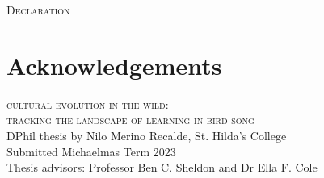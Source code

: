 \documentclass[9pt, twocolumn, twoside]{nilosthesis}
\begin{document}


\onecolumn
\normalsize

\pagecolor{white}


\normalsize
\copyrightpage




\normalsize
\onecolumn 

\vspace*{\fill - 1cm}
\begin{flushright}
{\scshape \Large{Declaration}}\\
\end{flushright}

\vspace*{\fill}


\normalsize
\pagecolor{white}


\onecolumn 
\chapter*{Acknowledgements}
\vspace{10pt}


\clearpage{\pagestyle{empty}\cleardoublepage} %
\bgroup
\hypersetup{linkcolor = black}
\tableofcontents
\listoffigures
\egroup

\clearpage{\pagestyle{empty}\cleardoublepage} %
\onecolumn
\vspace{13cm} %

{\raggedleft\scshape \Large{cultural evolution in the wild:}}\\
\normalsize
{\raggedleft\scshape {tracking the landscape of learning in bird song}} \\[.5cm]
DPhil thesis by Nilo Merino Recalde, St. Hilda's College\\Submitted Michaelmas Term 2023\\
Thesis advisors: Professor Ben C. Sheldon and Dr Ella F. Cole\\
\end{document}
